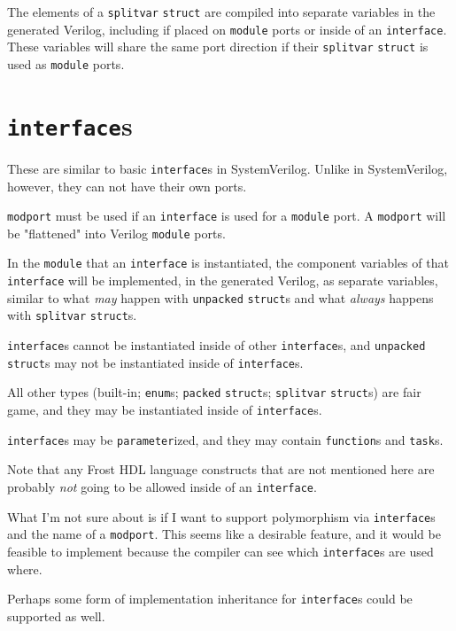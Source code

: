 \documentclass{article}
\begin{document}
	The elements of a \texttt{splitvar} \texttt{struct} are compiled into
	separate variables in the generated Verilog, including if placed on
	\texttt{module} ports or inside of an \texttt{interface}.  These
	variables will share the same port direction if their \texttt{splitvar}
	\texttt{struct} is used as \texttt{module} ports.


	\section{\texttt{interface}s}
	These are similar to basic \texttt{interface}s in SystemVerilog.
	Unlike in SystemVerilog, however, they can not have their own ports.

	\texttt{modport} must be used if an \texttt{interface} is used for a
	\texttt{module} port.  A \texttt{modport} will be "flattened" into
	Verilog \texttt{module} ports.

	In the \texttt{module} that an \texttt{interface} is instantiated, the
	component variables of that \texttt{interface} will be implemented, in
	the generated Verilog, as separate variables, similar to what
	\textit{may} happen with \texttt{unpacked} \texttt{struct}s and what
	\textit{always} happens with \texttt{splitvar} \texttt{struct}s.

	\texttt{interface}s cannot be instantiated inside of other
	\texttt{interface}s, and \texttt{unpacked} \texttt{struct}s may not be
	instantiated inside of \texttt{interface}s.

	All other types (built-in; \texttt{enum}s; \texttt{packed}
	\texttt{struct}s; \texttt{splitvar} \texttt{struct}s) are fair game,
	and they may be instantiated inside of \texttt{interface}s.

	\texttt{interface}s may be \texttt{parameter}ized, and they may contain
	\texttt{function}s and \texttt{task}s.

	Note that any Frost HDL language constructs that are not mentioned here
	are probably \textit{not} going to be allowed inside of an
	\texttt{interface}.

	What I'm not sure about is if I want to support polymorphism via
	\texttt{interface}s and the name of a \texttt{modport}.  This seems
	like a desirable feature, and it would be feasible to implement because
	the compiler can see which \texttt{interface}s are used where.

	Perhaps some form of implementation inheritance for \texttt{interface}s
	could be supported as well.

\end{document}
